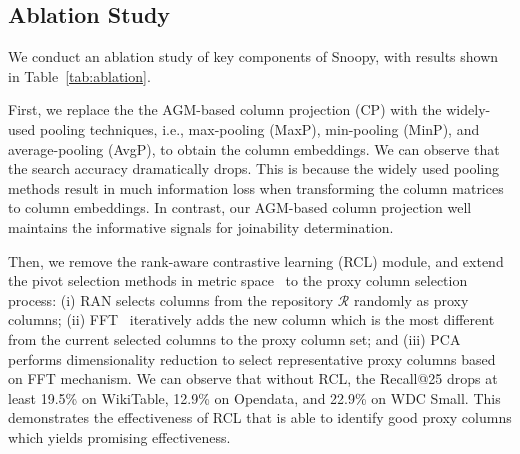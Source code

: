 \subsection{Ablation Study}
\label{sec:exp_ablation} 

We conduct an ablation study of key components of \textsf{Snoopy}, with results shown in Table~\ref{tab:ablation}.

First, we replace the the AGM-based column projection (CP) with the widely-used pooling techniques, i.e., max-pooling  (MaxP),  min-pooling (MinP), and average-pooling (AvgP), to obtain the column embeddings. 
We can observe that the search accuracy dramatically drops.
This is because the widely used pooling methods result in much information loss when transforming the column matrices to column embeddings.  In contrast, our
AGM-based column projection well maintains the informative signals for joinability determination. 

Then, we remove the rank-aware contrastive learning (RCL) module, and extend the pivot selection methods in metric space~\cite{ZhuCGJ22} to the proxy column selection process:
(i) RAN selects columns from the repository $\mathcal{R}$ randomly as proxy columns; (ii) FFT~\cite{fft}  iteratively adds the new column  which is the most different from the current selected columns to the proxy column set; and (iii) PCA~\cite{pca} performs dimensionality reduction to select representative proxy columns based on FFT mechanism.
We can observe that without RCL, the Recall@25 drops at least 19.5\% on WikiTable, 12.9\% on Opendata, and 22.9\% on WDC Small. This demonstrates the effectiveness of RCL that is able to identify good proxy columns which yields promising effectiveness.

